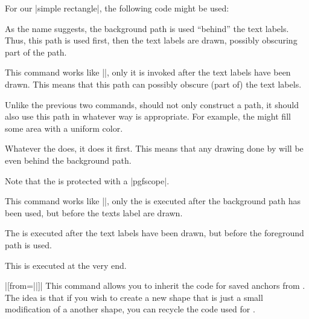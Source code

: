 \begin{command}{\pgfdeclareshape{}}
\begin{command}{\backgroundpath{}}
    For our |simple rectangle|, the following code might be used:
\begin{codeexample}
\end{codeexample}
    As the name suggests, the background path is used ``behind'' the
    text labels. Thus, this path is used first, then the text labels are
    drawn, possibly obscuring part of the path.
  \end{command}  
  \begin{command}{\foregroundpath{}}
    This command works like |\backgroundpath|, only it is invoked
    after the text labels have been drawn. This means that this path can
    possibly obscure (part of) the text labels.
  \end{command}  
  \begin{command}{\behindbackgroundpath{}}
    Unlike the previous two commands,  should not only
    construct a path, it should also use this path in whatever way is
    appropriate. For example, the  might fill some area
    with a uniform color.

    Whatever the  does, it does it first. This means that
    any drawing done by  will be even behind the background
    path.

    Note that the  is protected with a |{pgfscope}|.
  \end{command}  
  \begin{command}{\beforebackgroundpath{}}
    This command works like |\behindbackgroundpath|, only the
     is executed after the background path has been used,
    but before the texts label are drawn.
  \end{command}  
  \begin{command}{\behindforegroundpath{}}
    The  is executed after the text labels have been drawn,
    but before the foreground path is used.
  \end{command}  
  \begin{command}{\beforeforegroundpath{}}
    This  is executed at the very end.
  \end{command}  
  \begin{command}{\inheritsavedanchors|[from=||]|}
    This command allows you to inherit the code for saved anchors from
    . The idea is that if you wish to create
    a new shape that is just a small modification of a another shape,
    you can recycle the code used for .


\end{command}
\end{command}
